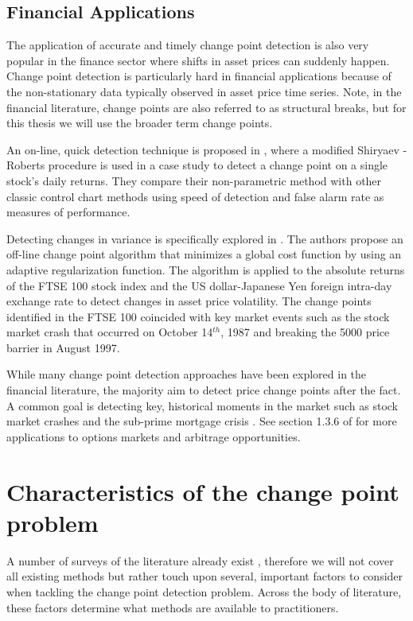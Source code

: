 \subsection{Financial Applications}
The application of accurate and timely change point detection is also very popular in the finance sector where shifts in asset prices can suddenly happen. Change point detection is particularly hard in financial applications because of the non-stationary data typically observed in asset price time series. Note, in the financial literature, change points  are also referred to as structural breaks, but for this thesis we will use the broader term change points.

An on-line, quick detection technique is proposed in  \cite{pepelyshev2015real}, where a modified Shiryaev - Roberts procedure is used in a case study to detect a change point on a single stock's daily returns. They compare their non-parametric method with other classic control chart methods using speed of detection and false alarm rate as measures of performance.

Detecting changes in variance is specifically explored in  \cite{lavielle2007adaptive}. The authors propose an off-line change point algorithm that minimizes a global cost function by using an adaptive regularization function. The algorithm is applied to the absolute returns of the FTSE 100 stock index and the US dollar-Japanese Yen foreign intra-day exchange rate to detect changes in asset price volatility. The change points  identified in the FTSE 100 coincided with key market events such as the stock market crash that occurred on October 14$^{th}$, 1987 and breaking the 5000 price barrier in August 1997.


While many change point detection approaches have been explored in the financial literature, the majority aim to detect price change points after the fact. A common goal is detecting key, historical moments in the market such as stock market crashes \cite{banerjee2019change}  and the sub-prime mortgage crisis \cite{zhu2015change}. See section 1.3.6 of \cite{tartakovsky2014sequential} for more applications to options markets and arbitrage opportunities.


\section{Characteristics of the change point problem}
A number of surveys of the literature already exist \cite{aminikhanghahi2017survey} \cite{niu2016multiple}, therefore we will not cover all existing methods but rather touch upon several, important factors to consider when tackling the change point detection problem. Across the body of literature, these factors determine what methods are available to practitioners. %

